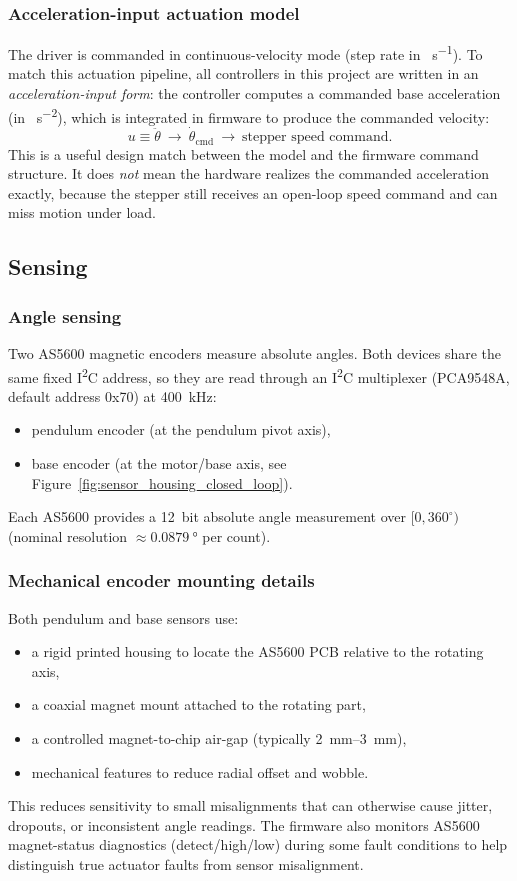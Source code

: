 \subsubsection*{Acceleration-input actuation model}
The driver is commanded in continuous-velocity mode (step rate in \si{\step\per\second}). To match this actuation pipeline, all controllers in this project are written in an \emph{acceleration-input form}: the controller computes a commanded base acceleration (in \si{\step\per\second\squared}), which is integrated in firmware to produce the commanded velocity:
\[
u \equiv \ddot{\theta} \ \longrightarrow\  \dot{\theta}_{\mathrm{cmd}} \ \longrightarrow\ \text{stepper speed command}.
\]
This is a useful design match between the model and the firmware command structure. It does \emph{not} mean the hardware realizes the commanded acceleration exactly, because the stepper still receives an open-loop speed command and can miss motion under load.

\subsection{Sensing}
\label{sec:sensing}
\subsubsection*{Angle sensing}
Two AS5600 magnetic encoders measure absolute angles. Both devices share the same fixed I\textsuperscript{2}C address, so they are read through an I\textsuperscript{2}C multiplexer (PCA9548A, default address 0x70) at \SI{400}{kHz}:
\begin{itemize}
  \item pendulum encoder (at the pendulum pivot axis),
  \item base encoder (at the motor/base axis, see Figure~\ref{fig:sensor_housing_closed_loop}).
\end{itemize}
Each AS5600 provides a \SI{12}{bit} absolute angle measurement over $[0,360^\circ)$ (nominal resolution $\approx \SI{0.0879}{\degree}$ per count).

\subsubsection*{Mechanical encoder mounting details}
Both pendulum and base sensors use:
\begin{itemize}
  \item a rigid printed housing to locate the AS5600 PCB relative to the rotating axis,
  \item a coaxial magnet mount attached to the rotating part,
  \item a controlled magnet-to-chip air-gap (typically \SIrange{2}{3}{mm}),
  \item mechanical features to reduce radial offset and wobble.
\end{itemize}
This reduces sensitivity to small misalignments that can otherwise cause jitter, dropouts, or inconsistent angle readings. The firmware also monitors AS5600 magnet-status diagnostics (detect/high/low) during some fault conditions to help distinguish true actuator faults from sensor misalignment.

